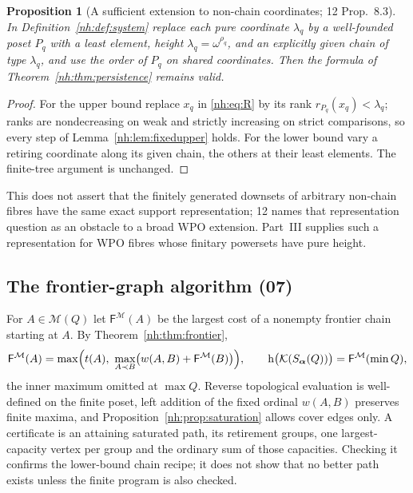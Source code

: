 \documentclass[11pt,a4paper]{article}
\newtheorem{proposition}[theorem]{Proposition}
\theoremstyle{definition}
\theoremstyle{remark}
\newcommand{\K}{\mathcal K}
\newcommand{\M}{\mathcal M}
\newcommand{\hgt}{\operatorname{h}}
\newcommand{\Fdp}{\mathsf F}
\begin{document}
\begin{proposition}[A sufficient extension to non-chain coordinates; 12 Prop.~8.3]
\label{nh:prop:generalcoordinates}
In Definition~\ref{nh:def:system} replace each pure coordinate $\lambda_q$ by a
well-founded poset $P_q$ with a least element, height $\lambda_q=\omega^{\rho_q}$,
and an explicitly given chain of type $\lambda_q$, and use the order of $P_q$ on
shared coordinates. Then the formula of Theorem~\ref{nh:thm:persistence} remains
valid.
\end{proposition}
\begin{proof}
For the upper bound replace $x_q$ in \eqref{nh:eq:R} by its rank
$r_{P_q}(x_q)<\lambda_q$; ranks are nondecreasing on weak and strictly increasing
on strict comparisons, so every step of Lemma~\ref{nh:lem:fixedupper} holds. For
the lower bound vary a retiring coordinate along its given chain, the others at
their least elements. The finite-tree argument is unchanged.
\end{proof}

This does not assert that the finitely generated downsets of arbitrary non-chain
fibres have the same exact support representation; 12 names that representation
question as an obstacle to a broad WPO extension. Part~III supplies such a
representation for WPO fibres whose finitary powersets have pure height.

\subsection{The frontier-graph algorithm (07)}\label{nh:sec:frontieralgorithm}

For $A\in\M(Q)$ let $\Fdp^{\M}(A)$ be the largest cost of a nonempty frontier
chain starting at $A$. By Theorem~\ref{nh:thm:frontier},
\begin{equation}\label{nh:eq:frontierDP}
 \Fdp^{\M}(A)=\max\Bigl(t(A),\ \max_{A\prec B}\bigl(w(A,B)+\Fdp^{\M}(B)\bigr)\Bigr),
 \qquad
 \hgt\bigl(\K(S_{\boldsymbol\alpha}(Q))\bigr)=\Fdp^{\M}(\min Q),
\end{equation}
the inner maximum omitted at $\max Q$. Reverse topological evaluation is
well-defined on the finite poset, left addition of the fixed ordinal $w(A,B)$
preserves finite maxima, and Proposition~\ref{nh:prop:saturation} allows cover
edges only. A certificate is an attaining saturated path, its retirement groups,
one largest-capacity vertex per group and the ordinary sum of those capacities.
Checking it confirms the lower-bound chain recipe; it does not show that no
better path exists unless the finite program is also checked.
\end{document}
